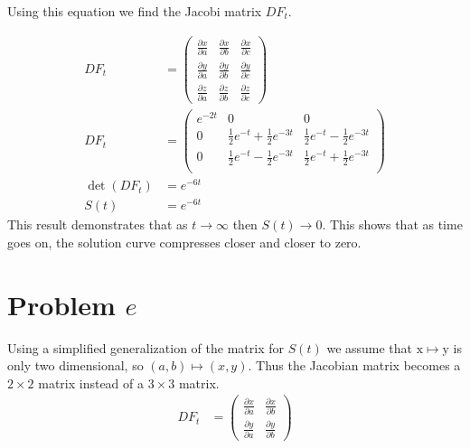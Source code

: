 \documentclass[10pt]{article}
\newenvironment{Figure}
{\par\medskip\noindent\minipage{\linewidth}}
{\endminipage\par\medskip}
\newcommand{\der}[2]{\frac{\partial{} #1}{\partial{} #2}}
\begin{document}
\begin{multicols}{2}
  Using this equation we find the Jacobi matrix $DF_t$.

  \begin{align*}
    DF_t &= \begin{pmatrix}
      \frac{\partial x}{\partial a} & \frac{\partial x}{\partial b} & \frac{\partial x}{\partial c} \\
      \frac{\partial y}{\partial a} & \frac{\partial y}{\partial b} & \frac{\partial y}{\partial c} \\
      \frac{\partial z}{\partial a} & \frac{\partial z}{\partial b} & \der{z}{c}
    \end{pmatrix} \\
    DF_t &= \begin{pmatrix}
      e^{-2t} & 0 & 0 \\
      0 & \frac{1}{2}e^{-t} + \frac{1}{2}e^{-3t} & \frac{1}{2}e^{-t} - \frac{1}{2}e^{-3t}\\
      0 & \frac{1}{2}e^{-t} - \frac{1}{2}e^{-3t} & \frac{1}{2}e^{-t} + \frac{1}{2}e^{-3t}\\
    \end{pmatrix} \\
    \det \left(DF_t\right) &= e^{-6t}\\
    S\left( t \right) &= e^{-6t}
  \end{align*}
  This result demonstrates that as $t \rightarrow \infty$ then $S(t) \rightarrow 0$. This shows that
  as time goes on, the solution curve compresses closer and closer to zero.
  \begin{Figure}
    \centering
    \def\svgwidth{\columnwidth}
    
    \label{fig:p2_1}
  \end{Figure}

  \section{Problem $e$}\label{sec:problem_e_}

  Using a simplified generalization of the matrix for $S(t)$ we assume that
  $\mathrm{x} \mapsto \mathrm{y}$ is only two dimensional, so $(a, b) \mapsto
  (x,y)$. Thus the Jacobian matrix becomes a $2 \times 2$ matrix instead of a
  $3 \times 3$ matrix.
  \begin{align*}
    DF_t &= \begin{pmatrix}
      \der{x}{a} & \der{x}{b} \\
      \der{y}{a} & \der{y}{b}
    \end{pmatrix}
  \end{align*}


\end{multicols}
\end{document}
